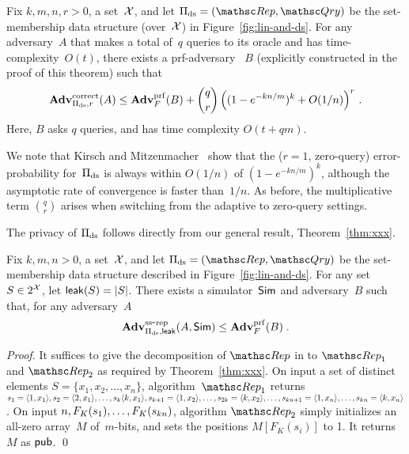 \begin{theorem}\label{thm2}\label{thm:ds-correctness}
Fix $k,m,n,r>0$, a set~${\cal X}$, and let $\setprim_{\mathrm{ds}}= (\Rep, \Qry)$ be the set-membership data structure (over~${\cal X}$) in Figure~\ref{fig:lin-and-ds}.  For any adversary~$A$ that makes a total of~$q$ queries to its oracle and has time-complexity~$O(t)$, there exists a prf-adversary ~$B$ (explicitly constructed in the proof of this theorem) such that
\[
\mathrm{\mathbf{Adv}}^{\mathrm{correct}}_{\Pi_{\mathrm{ds}},r}(A) \leq  \mathbf{Adv}^{\mathrm{prf}}_{F}(B)  + {\dbinom{q}{r}} \left( (1-e^{-kn/m})^k + O(1/n) \right)^r\,.
\]
Here, $B$ asks $q$ queries, and has time complexity $O(t+qm)$.
\end{theorem}
We note that Kirsch and Mitzenmacher~\cite{xxx} show
that the ($r=1$, zero-query) error-probability for~$\Pi_\mathrm{ds}$ is
always within $O(1/n)$ of $(1-e^{-kn/m})^k$, although the asymptotic
rate of convergence is faster than~$1/n$.   As before, the multiplicative term $\binom{q}{r}$ arises when switching from the adaptive to zero-query settings.



The privacy of $\Pi_{\mathrm{ds}}$ follows directly from our general result, Theorem~\ref{thm:xxx}.
\begin{theorem}\label{thm:ds-ss}
Fix $k,m,n>0$, a set~${\cal X}$, and let $\setprim_{\mathrm{ds}}= (\Rep, \Qry)$ be the set-membership data structure described in Figure~\ref{fig:lin-and-ds}.  For any set~$S \in 2^{\cal X}$, let ${\sf leak}(S)=|S|$.  There exists a simulator~${\sf Sim}$ and adversary~$B$ such that, for any adversary~$A$
\[
\mathrm{\mathbf{Adv}}^{\mathrm{ss\mbox{-}rep}}_{\Pi_{\mathrm{ds}},{\sf leak}}(A,{\sf Sim}) \leq  \mathbf{Adv}^{\mathrm{prf}}_{F}(B)\;.
\]
\end{theorem}
\begin{proof}
It suffices to give the decomposition of $\Rep$ in to $\Rep_1$ and $\Rep_2$ as required by Theorem~\ref{thm:xxx}.
On input a set of distinct elements $S=\{x_1,x_2,\ldots,x_n\}$, algorithm~$\Rep_1$ returns $s_1=\langle 1,x_1 \rangle, s_2=\langle 2,x_1 \rangle, \ldots, s_k\langle k,x_1\rangle, s_{k+1}=\langle 1,x_2\rangle, \ldots,\linebreak s_{2k}=\langle k,x_2\rangle, \ldots ,s_{kn+1}=\langle 1,x_n\rangle, \ldots, s_{kn}=\langle k,x_n \rangle$.  On input $n,F_K(s_1),\ldots,\linebreak F_K(s_{kn})$, algorithm $\Rep_2$ simply initializes an all-zero array~$M$ of~$m$-bits, and sets the positions $M[F_K(s_i)]$ to 1.  It returns~$M$ as ${\sf pub}$. \hfill\qed
\end{proof}


